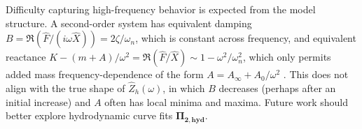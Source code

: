 \documentclass[10pt,twoside]{article}
\begin{document}
Difficulty capturing high-frequency behavior is expected from the model structure. 
A second-order system has equivalent damping $B=\Re(\hat{F}/(i\omega\hat{X}))=2\zeta/\omega_n$, which is constant across frequency, and equivalent reactance $K-(m+A)/\omega^2=\Re(\hat{F}/\hat{X})\sim 1-\omega^2/\omega_n^2$, which only permits added mass frequency-dependence of the form $A = A_\infty + A_0/\omega^2$ \cite{franklin2014feedback}.
This does not align with the true shape of $\hat{Z}_h(\omega)$, in which $B$ decreases (perhaps after an initial increase) and $A$ often has local minima and maxima.
Future work should better explore hydrodynamic curve fits $\mathbf{\Pi_{2,hyd}}$.
\end{document}
